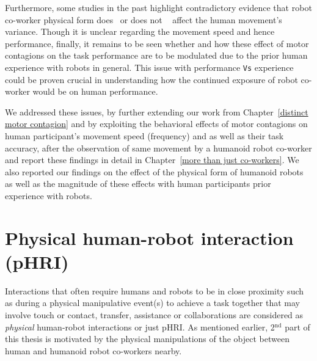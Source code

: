 Furthermore, some studies in the past highlight contradictory evidence that robot co-worker physical form does~\cite{Chaminade:JPP:2009} or does not ~\cite{Kupferberg:PlosOne:2012} affect the human movement's variance. Though it is unclear regarding the movement speed and hence performance, finally, it remains to be seen whether and how these effect of motor contagions on the task performance are to be modulated due to the prior human experience with robots in general. This issue with performance \texttt{Vs} experience could be proven crucial in understanding how the continued exposure of robot co-worker would be on human performance.

We addressed these issues, by further extending our work from Chapter~\ref{distinct motor contagion} and by exploiting the behavioral effects of motor contagions on human participant's movement speed (frequency) and as well as their task accuracy, after the observation of same movement by a humanoid robot co-worker and report these findings in detail in Chapter~\ref{more than just co-workers}. We also reported our findings on the effect of the physical form of humanoid robots as well as the magnitude of these effects with human participants prior experience with robots.




\section{Physical human-robot interaction (pHRI)}

Interactions that often require humans and robots to be in close proximity such as during a physical manipulative event(s) to achieve a task together that may involve touch or contact, transfer, assistance or collaborations are considered as \textit{physical} human-robot interactions or just pHRI. As mentioned earlier, 2$^\text{nd}$ part of this thesis is motivated by the physical manipulations of the object between human and humanoid robot co-workers nearby. 

